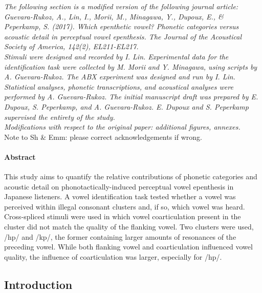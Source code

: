\textit{{\color{darkgray}The following section is a modified version of the following journal article: \\
Guevara-Rukoz, A., Lin, I., Morii, M., Minagawa, Y., Dupoux, E., \& Peperkamp, S. (2017). Which epenthetic vowel? Phonetic categories versus acoustic detail in perceptual vowel epenthesis. The Journal of the Acoustical Society of America, 142(2), EL211-EL217. \\
Stimuli were designed and recorded by I. Lin.
Experimental data for the identification task were collected by M. Morii and Y. Minagawa, using scripts by A. Guevara-Rukoz. The ABX experiment was designed and run by I. Lin.
Statistical analyses, phonetic transcriptions, and acoustical analyses were performed by A. Guevara-Rukoz.
The initial manuscript draft was prepared by E. Dupoux, S. Peperkamp, and A. Guevara-Rukoz.
E. Dupoux and S. Peperkamp supervised the entirety of the study.\\
Modifications with respect to the original paper: additional figures, annexes.\\}}
{\color{red}Note to Sh \& Emm: please correct acknowledgements if wrong.}
\paragraph{Abstract}

This study aims to quantify the relative contributions of phonetic categories and acoustic detail on phonotactically-induced perceptual vowel epenthesis in Japanese listeners. A vowel identification task tested whether a vowel was perceived within illegal consonant clusters and, if so, which vowel was heard. Cross-spliced stimuli were used in which vowel coarticulation present in the cluster did not match the quality of the flanking vowel. Two clusters were used, /hp/ and /kp/, the former containing larger amounts of resonances of the preceding vowel. While both flanking vowel and coarticulation influenced vowel quality, the influence of coarticulation was larger, especially for /hp/.

\subsection{Introduction}

\setlength{\parindent}{5ex}

